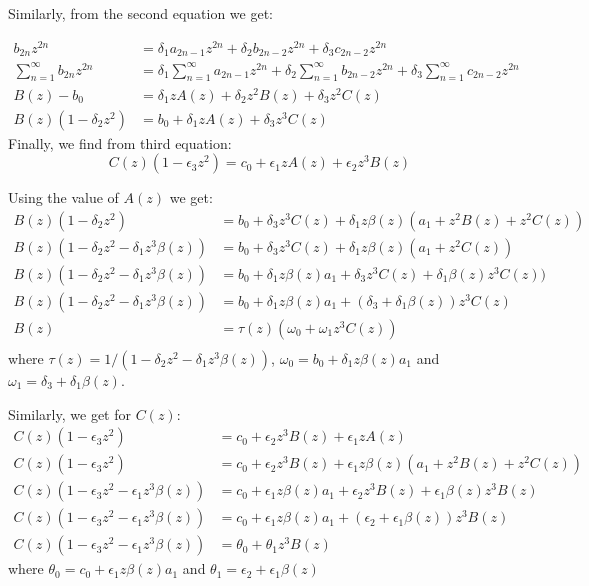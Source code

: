 \documentclass[11pt,a4paper]{article}
\begin{document}
Similarly, from the second equation we get:


\begin{align}
b_{2n}  z^{2n}&= \delta_1 a_{2n-1} z^{2n} + \delta_2 b_{2n-2} z^{2n} +  \delta_3 c_{2n-2} z^{2n}\\
\sum_{n=1}^{\infty} b_{2n}  z^{2n}&=\delta_1   \sum_{n=1}^{\infty}a_{2n-1} z^{2n} + \delta_2  \sum_{n=1}^{\infty}  b_{2n-2} z^{2n} +  \delta_3 \sum_{n=1}^{\infty}c_{2n-2} z^{2n}\\
B(z) -b_0 &=\delta_1  z A(z) + \delta_2 z^2 B(z) + \delta_3 z^2 C(z)\\
B(z)(1 - \delta_2 z^2 )  &=  b_0 + \delta_1  z A(z) +  \delta_3 z^3 C(z)
\end{align}
Finally, we find from third equation:
\begin{equation}
C(z)(1 - \epsilon_3 z^2 )  =  c_0 + \epsilon_1  z A(z) +  \epsilon_2 z^3 B(z)
\end{equation}

Using the value of $A(z)$ we get:
\begin{align*}
B(z)(1 - \delta_2 z^2 )  &=  b_0 + \delta_3 z^3 C(z) +  \delta_1  z   \beta(z) (a_1  +  z^2 B(z) + z^2 C(z)) \\
B(z)(1 - \delta_2 z^2 -\delta_1  z^3   \beta(z) )  &=  b_0 + \delta_3 z^3 C(z) +  \delta_1  z   \beta(z)  (a_1  +   z^2 C(z)) \\
B(z)(1 - \delta_2 z^2 -\delta_1  z^3   \beta(z) )  &=  b_0 +  \delta_1  z   \beta(z)  a_1 + \delta_3 z^3 C(z) +  \delta_1     \beta(z)   z^3 C(z)) \\
B(z)(1 - \delta_2 z^2 -\delta_1  z^3   \beta(z) )  &=  b_0 +  \delta_1  z   \beta(z)  a_1 + (\delta_3 +  \delta_1     \beta(z) )  z^3 C(z) \\
B(z)  &=  \tau(z) ( \omega_0+    \omega_1 z^3 C(z) )\\
\end{align*}
where $\tau(z) = 1/ (1 - \delta_2 z^2 -\delta_1  z^3   \beta(z) )$,  $\omega_0= b_0 +  \delta_1  z   \beta(z)  a_1 $ and $\omega_1= \delta_3 +  \delta_1     \beta(z) $.

Similarly, we get for $C(z)$:
\begin{align*}
C(z)(1 - \epsilon_3 z^2 ) & =  c_0 +   \epsilon_2 z^3 B(z) + \epsilon_1  z A(z)\\
C(z)(1 - \epsilon_3 z^2 )  &=  c_0 +   \epsilon_2 z^3 B(z) + \epsilon_1  z \beta(z) (a_1  +  z^2 B(z) + z^2 C(z))\\
C(z)(1 - \epsilon_3 z^2 - \epsilon_1  z^3   \beta(z))  &=  c_0 +  \epsilon_1  z \beta(z) a_1+  \epsilon_2 z^3 B(z) + \epsilon_1   \beta(z) z^3 B(z) \\
C(z)(1 - \epsilon_3 z^2 - \epsilon_1  z^3   \beta(z))  &=  c_0 +  \epsilon_1  z \beta(z) a_1+  (\epsilon_2 + \epsilon_1   \beta(z)) z^3 B(z)\\
C(z)(1 - \epsilon_3 z^2 - \epsilon_1  z^3   \beta(z))  &=  \theta_0+ \theta_1  z^3 B(z)
\end{align*}
where $\theta_0= c_0 +  \epsilon_1  z \beta(z) a_1$ and $\theta_1= \epsilon_2 + \epsilon_1   \beta(z)$
\end{document}
